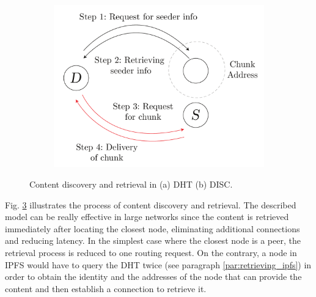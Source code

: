 \begin{figure}
    \begin{subfigure}{0.5\textwidth}
        \centering
        \includegraphics[width=\linewidth]{figs/dht.pdf}
        \caption{}
        \label{fig:dht}
    \end{subfigure}
    \hfill
    \begin{subfigure}{0.5\textwidth}
        \centering
        \caption{}
        \label{fig:disc}
    \end{subfigure}
    \caption{Content discovery and retrieval in (a) DHT (b) DISC.}
    \label{fig:content_discovery}
\end{figure}

Fig. \ref{fig:content_discovery} illustrates the process of content discovery and retrieval. The described model can be really effective in large networks since the content is retrieved immediately after locating the closest node, eliminating additional connections and reducing latency. In the simplest case where the closest node is a peer, the retrieval process is reduced to one routing request. On the contrary, a node in IPFS would have to query the DHT twice (see paragraph \ref{par:retrieving_ipfs}) in order to obtain the identity and the addresses of the node that can provide the content and then establish a connection to retrieve it. 

